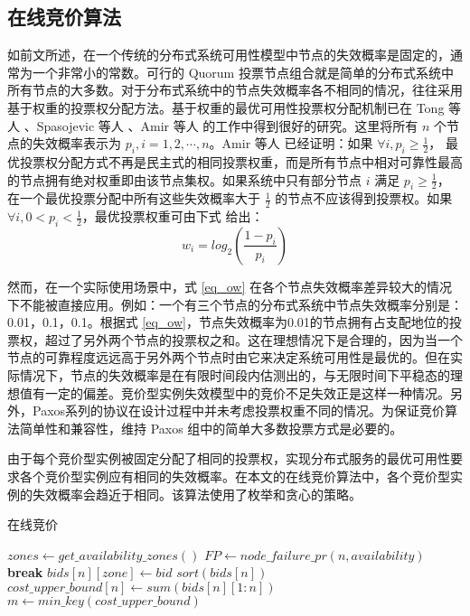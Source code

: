 \subsection{在线竞价算法}
\label{subsec:jupiter-bidding}
如前文所述，在一个传统的分布式系统可用性模型中节点的失效概率是固定的，通常为一个非常小的常数。可行的 Quorum 投票节点组合就是简单的分布式系统中所有节点的大多数。对于分布式系统中的节点失效概率各不相同的情况，往往采用基于权重的投票权分配方法。基于权重的最优可用性投票权分配机制已在 Tong 等人 \cite{25789}、Spasojevic 等人 \cite{262589}、Amir 等人 \cite{Amir1998223} 的工作中得到很好的研究。这里将所有 $n$ 个节点的失效概率表示为 $p_i, i = 1, 2, \cdots, n$。Amir 等人 \cite{Amir1998223} 已经证明：如果 $\forall i, p_i \geq \frac{1}{2}$， 最优投票权分配方式不再是民主式的相同投票权重，而是所有节点中相对可靠性最高的节点拥有绝对权重即由该节点集权。如果系统中只有部分节点 $i$ 满足 $p_i \geq \frac{1}{2}$， 在一个最优投票分配中所有这些失效概率大于 $\frac{1}{2}$ 的节点不应该得到投票权。如果 $\forall i, 0 < p_i < \frac{1}{2}$，最优投票权重可由下式 \cite{262589, 25789} 给出：
\begin{equation}\label{eq_ow}
w_i = log_2(\frac{1-p_i}{p_i})
\end{equation}

然而，在一个实际使用场景中，式 \eqref{eq_ow} 在各个节点失效概率差异较大的情况下不能被直接应用。例如：一个有三个节点的分布式系统中节点失效概率分别是：0.01，0.1，0.1。根据式 \eqref{eq_ow}，节点失效概率为0.01的节点拥有占支配地位的投票权，超过了另外两个节点的投票权之和。这在理想情况下是合理的，因为当一个节点的可靠程度远远高于另外两个节点时由它来决定系统可用性是最优的。但在实际情况下，节点的失效概率是在有限时间段内估测出的，与无限时间下平稳态的理想值有一定的偏差。竞价型实例失效模型中的竞价不足失效正是这样一种情况。另外，Paxos系列的协议在设计过程中并未考虑投票权重不同的情况。为保证竞价算法简单性和兼容性，维持 Paxos 组中的简单大多数投票方式是必要的。

由于每个竞价型实例被固定分配了相同的投票权，实现分布式服务的最优可用性要求各个竞价型实例应有相同的失效概率。在本文的在线竞价算法中，各个竞价型实例的失效概率会趋近于相同。该算法使用了枚举和贪心的策略。

\begin{algorithm}
\caption{在线竞价}
\label{algo:bidding}
$zones\gets get\_availability\_zones()$
{
  $FP\gets node\_failure\_pr(n, availability)$
  {
    \ForEach{$bid \in [zone.spot\_prices[1], zone.on\_demand\_price)$}
    {
      {
        \textbf{break}
      }
    }
    $bids[n][zone]\gets bid$\;
  }
  $sort(bids[n])$\;
  $cost\_upper\_bound[n]\gets sum(bids[n][1:n])$\;
}
$m\gets min\_key(cost\_upper\_bound)$\;
\;
\end{algorithm}

